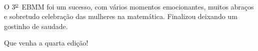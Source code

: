 \documentclass{hipatia}
\newcommand{\superau}{\textsuperscript{\underline{a}}~}
\newcommand{\superou}{\textsuperscript{\underline{o}}~}
\begin{document}
O 3\superou EBMM foi um sucesso, com vários momentos emocionantes, muitos abraços e sobretudo celebração das mulheres na matemática. Finalizou deixando um gostinho de saudade.

Que venha a quarta edição!


 


 


 

\end{document}
